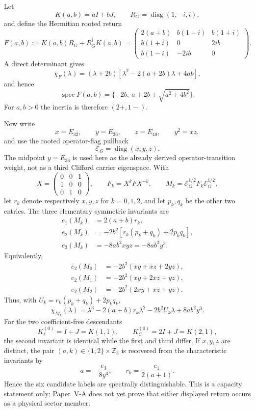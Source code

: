 \documentclass[11pt,a4paper]{article}
\begin{document}
Let
\[
 K(a,b)=aI+bJ,
 \qquad
 R_G=\operatorname{diag}(1,-i,i),
\]
and define the Hermitian rooted return
\begin{equation}
\label{p6:eq:v562-phase-refined-return}
 F(a,b):=K(a,b)R_G+R_G^\dagger K(a,b)
 =\begin{pmatrix}
 2(a+b)&b(1-i)&b(1+i)\\
 b(1+i)&0&2ib\\
 b(1-i)&-2ib&0
 \end{pmatrix}.
\end{equation}
A direct determinant gives
\begin{equation}
\label{p6:eq:v562-f-charpoly}
 \chi_F(\lambda)
 =(\lambda+2b)
 \left[\lambda^2-2(a+2b)\lambda+4ab\right],
\end{equation}
and hence
\[
 \operatorname{spec}F(a,b)
 =\{-2b,\ a+2b\pm\sqrt{a^2+4b^2}\}.
\]
For \(a,b>0\) the inertia is therefore \((2+,1-)\).

Now write
\[
 x=E_{32},\qquad y=E_{36},\qquad z=E_{40},
 \qquad y^2=xz,
\]
and use the rooted operator-flag pullback
\[
 \mathcal E_G=\operatorname{diag}(x,y,z).
\]
The midpoint \(y=E_{36}\) is used here as the already derived
operator-transition weight, not as a third Clifford carrier eigenspace.  With
\[
 X=\begin{pmatrix}0&0&1\\1&0&0\\0&1&0\end{pmatrix},\qquad
 F_k=X^kFX^{-k},\qquad
 M_k=\mathcal E_G^{1/2}F_k\mathcal E_G^{1/2},
\]
let \(r_k\) denote respectively \(x,y,z\) for \(k=0,1,2\), and let
\(p_k,q_k\) be the other two entries.  The three elementary symmetric
invariants are
\begin{align}
 e_1(M_k)&=2(a+b)r_k,\label{p6:eq:v562-e1}\\
 e_2(M_k)&=-2b^2\left[r_k(p_k+q_k)+2p_kq_k\right],\label{p6:eq:v562-e2}\\
 e_3(M_k)&=-8ab^2xyz=-8ab^2y^3.\label{p6:eq:v562-e3}
\end{align}
Equivalently,
\begin{align*}
 e_2(M_0)&=-2b^2(xy+xz+2yz),\\
 e_2(M_1)&=-2b^2(xy+2xz+yz),\\
 e_2(M_2)&=-2b^2(2xy+xz+yz).
\end{align*}
Thus, with
\(U_k=r_k(p_k+q_k)+2p_kq_k\),
\begin{equation}
\label{p6:eq:v562-mk-charpoly}
 \boxed{\chi_{M_k}(\lambda)
 =\lambda^3-2(a+b)r_k\lambda^2-2b^2U_k\lambda+8ab^2y^3.}
\end{equation}
For the two coefficient-free descendants
\[
 K_\ell^{(0)}=I+J=K(1,1),\qquad
 K_C^{(0)}=2I+J=K(2,1),
\]
the second invariant is identical while the first and third differ.  If
\(x,y,z\) are distinct, the pair \((a,k)\in\{1,2\}\times\mathbb Z_3\) is
recovered from the characteristic invariants by
\[
 a=-\frac{e_3}{8y^3},\qquad
 r_k=\frac{e_1}{2(a+1)}.
\]
Hence the six candidate labels are spectrally distinguishable.  This is a
capacity statement only; Paper~V-A does not yet prove that either displayed
return occurs as a physical sector member.
\end{document}
